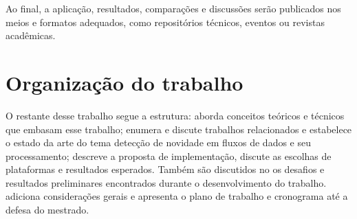 Ao final, a aplicação, resultados, comparações e discussões serão publicados
nos meios e formatos adequados, como repositórios técnicos, eventos ou revistas
acadêmicas.

\section{Organização do trabalho}

O restante desse trabalho segue a estrutura:
 aborda conceitos teóricos e técnicos que embasam
esse trabalho;
 enumera e discute trabalhos relacionados e estabelece
o estado da arte do tema detecção de novidade em fluxos de dados e seu processamento;
 descreve a proposta de implementação, discute
as escolhas de plataformas e resultados esperados.
Também são discutidos no  os desafios e resultados preliminares encontrados
durante o desenvolvimento do trabalho.
 adiciona considerações gerais e apresenta o plano de trabalho
e cronograma até a defesa do mestrado.
